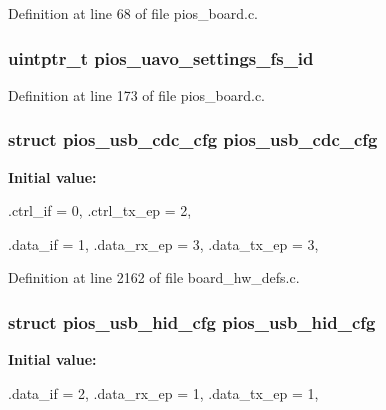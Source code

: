 \-Definition at line 68 of file pios\-\_\-board.\-c.

\hypertarget{group___flying_f3_gab060f441dd600b08386c0ca1b487217a}{
\subsubsection[{pios\-\_\-uavo\-\_\-settings\-\_\-fs\-\_\-id}]{\setlength{\rightskip}{0pt plus 5cm}uintptr\-\_\-t {\bf pios\-\_\-uavo\-\_\-settings\-\_\-fs\-\_\-id}}}\label{group___flying_f3_gab060f441dd600b08386c0ca1b487217a}


\-Definition at line 173 of file pios\-\_\-board.\-c.

\hypertarget{group___flying_f3_ga05cc3e449d417c7f9097d2659e6f5ca3}{
\subsubsection[{pios\-\_\-usb\-\_\-cdc\-\_\-cfg}]{\setlength{\rightskip}{0pt plus 5cm}struct {\bf pios\-\_\-usb\-\_\-cdc\-\_\-cfg} {\bf pios\-\_\-usb\-\_\-cdc\-\_\-cfg}}}\label{group___flying_f3_ga05cc3e449d417c7f9097d2659e6f5ca3}
{\bfseries \-Initial value\-:}
\begin{DoxyCode}
 {
        .ctrl_if = 0,
        .ctrl_tx_ep = 2,

        .data_if = 1,
        .data_rx_ep = 3,
        .data_tx_ep = 3,
}
\end{DoxyCode}


\-Definition at line 2162 of file board\-\_\-hw\-\_\-defs.\-c.

\hypertarget{group___flying_f3_ga3665f6d3a2cccc431b55b9432291e94c}{
\subsubsection[{pios\-\_\-usb\-\_\-hid\-\_\-cfg}]{\setlength{\rightskip}{0pt plus 5cm}struct {\bf pios\-\_\-usb\-\_\-hid\-\_\-cfg} {\bf pios\-\_\-usb\-\_\-hid\-\_\-cfg}}}\label{group___flying_f3_ga3665f6d3a2cccc431b55b9432291e94c}
{\bfseries \-Initial value\-:}
\begin{DoxyCode}
 {
        .data_if = 2,
        .data_rx_ep = 1,
        .data_tx_ep = 1,
}
\end{DoxyCode}


